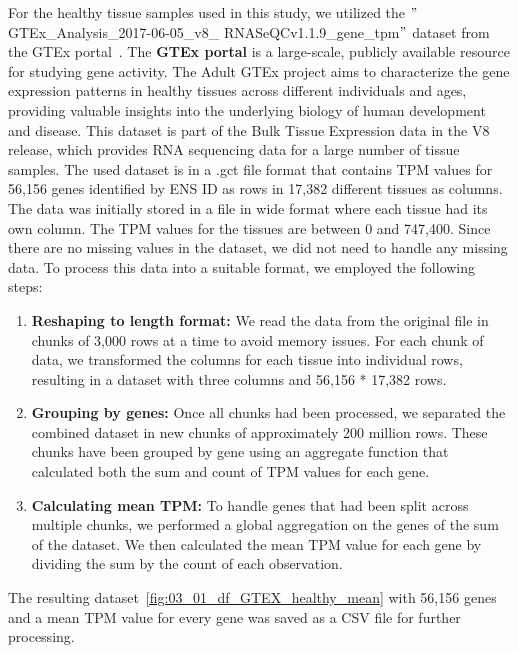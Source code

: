 For the healthy tissue samples used in this study,
we utilized the $"$GTEx\_Analysis\_2017-06-05\_v8\_\newline
RNASeQCv1.1.9\_gene\_tpm$"$ dataset from the GTEx portal~\cite{gtex_download}.
The \textbf{GTEx portal} is a large-scale, publicly available resource for studying gene activity.
The Adult GTEx project aims to characterize the gene expression patterns in healthy tissues across different individuals and ages,
providing valuable insights into the underlying biology of human development and disease.
This dataset is part of the Bulk Tissue Expression data in the V8 release,
which provides RNA sequencing data for a large number of tissue samples.
The used dataset is in a .gct file format that contains TPM values for 56,156 genes identified by ENS ID as rows in 17,382 different tissues as columns.
The data was initially stored in a file in wide format where each tissue had its own column.
The TPM values for the tissues are between 0 and 747,400.
Since there are no missing values in the dataset, we did not need to handle any missing data.
To process this data into a suitable format, we employed the following steps:
\begin{enumerate}
    \item \textbf{Reshaping to length format:} We read the data from the original file in chunks of 3,000 rows at a time to avoid memory issues.
    For each chunk of data, we transformed the columns for each tissue into individual rows,
    resulting in a dataset with three columns and 56,156 * 17,382 rows.
    \item \textbf{Grouping by genes:} Once all chunks had been processed, we separated the combined dataset in new chunks of approximately 200 million rows.
    These chunks have been grouped by gene using an aggregate function that calculated both the sum and count of TPM values for each gene.
    \item \textbf{Calculating mean TPM:} To handle genes that had been split across multiple chunks,
    we performed a global aggregation on the genes of the sum of the dataset.
    We then calculated the mean TPM value for each gene by dividing the sum by the count of each observation.
\end{enumerate}
The resulting dataset~\ref{fig:03_01_df_GTEX_healthy_mean} with 56,156 genes and a mean TPM value for every gene was saved as a CSV file for further processing.\\

